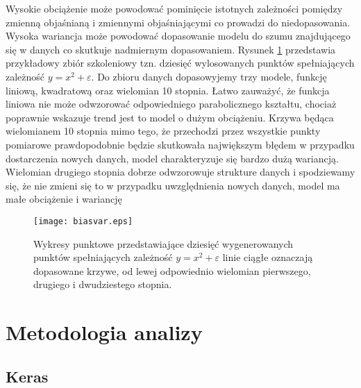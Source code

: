 \documentclass[11pt]{book}
\theoremstyle{definition}
\begin{document}
Wysokie obciążenie może powodować pominięcie istotnych zależności pomiędzy zmienną objaśnianą i zmiennymi objaśniającymi co prowadzi do niedopasowania. Wysoka wariancja może powodować dopasowanie modelu do szumu znajdującego się w danych co skutkuje nadmiernym dopasowaniem. Rysunek \ref{fig:biasvar} przedstawia przykładowy zbiór szkoleniowy tzn. dziesięć wylosowanych punktów spełniających zależność $y = x^2 + \varepsilon$. Do zbioru danych dopasowyjemy trzy modele, funkcję liniową, kwadratową oraz wielomian 10 stopnia. Łatwo zauważyć, że funkcja liniowa nie może odwzorować odpowiedniego parabolicznego kształtu, chociaż poprawnie wskazuje trend jest to model o dużym obciążeniu. Krzywa będąca wielomianem 10 stopnia mimo tego, że przechodzi przez wszystkie punkty pomiarowe prawdopodobnie będzie skutkowała największym błędem w przypadku dostarczenia nowych danych, model charakteryzuje się bardzo dużą wariancją. Wielomian drugiego stopnia dobrze odwzorowuje strukture danych i spodziewamy się, że nie zmieni się to w przypadku uwzględnienia nowych danych, model ma małe obciążenie i wariancję

\begin{figure}[h!]
	\centering
	\texttt{[image: biasvar.eps]}
	\caption{Wykresy punktowe przedstawiające dziesięć wygenerowanych punktów spełniających zależność $y = x^2 + \varepsilon$ linie ciągłe oznaczają dopasowane krzywe, od lewej odpowiednio wielomian pierwszego, drugiego i dwudziestego stopnia.}
	\label{fig:biasvar}
\end{figure}


\chapter{Metodologia analizy}


\section{Keras}
\end{document}

